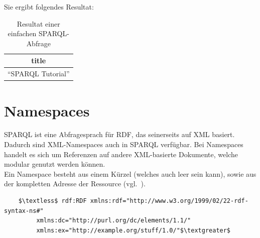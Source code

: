 Sie ergibt folgendes Resultat:
\noindent\hspace*{15mm}
\begin{table}[h]
    \centering
    \begin{tabular}{|l|}
        \hline
        \multicolumn{1}{|c|}{\textbf{title}} \\ \hline
        ``SPARQL Tutorial''                    \\ \hline
    \end{tabular}
    \caption{Resultat einer einfachen SPARQL-Abfrage\protect\footnotemark}
\end{table}

\section{Namespaces}
\label{sec:sparql_namespaces}

SPARQL ist eine Abfragesprach für RDF, das seinerseits auf XML basiert. Dadurch sind XML-Namespaces auch in SPARQL verfügbar. Bei Namespaces handelt es sich um Referenzen auf andere XML-basierte Dokumente, welche modular genutzt werden können.\\
Ein Namespace besteht aus einem Kürzel (welches auch leer sein kann), sowie aus der kompletten Adresse der Ressource (vgl.~\cite[2.1 Introduction]{w3rdf_syntax}).

\begin{lstlisting}
    $\textless$ rdf:RDF xmlns:rdf="http://www.w3.org/1999/02/22-rdf-syntax-ns#"
         xmlns:dc="http://purl.org/dc/elements/1.1/"
         xmlns:ex="http://example.org/stuff/1.0/"$\textgreater$
\end{lstlisting}


